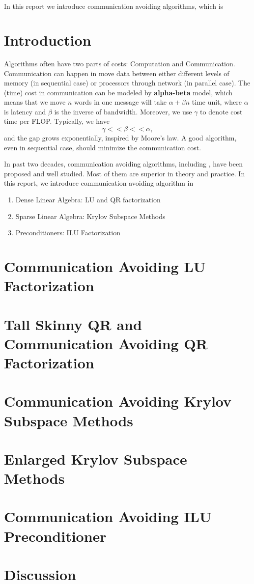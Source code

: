 \documentclass{article}
\begin{document}
	\maketitle
	\thispagestyle{fancy}
	\tableofcontents
	
	\section*{}
 In this report we introduce communication avoiding algorithms, which is
 
 
 \section{Introduction}
 Algorithms often have two parts of costs: Computation and Communication. Communication can happen in move data between either different levels of memory (in sequential case) or processors through network (in parallel case). The (time) cost in communication can be modeled by \textbf{alpha-beta} model, which means that we move $n$ words in one message will take $\alpha + \beta n$ time unit, where $\alpha$ is latency and $\beta$ is the inverse of bandwidth. Moreover, we use $\gamma$ to denote cost time per FLOP. Typically, we have $$\gamma << \beta << \alpha,$$ and the gap grows exponentially, inspired by Moore's law. A good algorithm, even in sequential case, should minimize the communication cost.
 
 
In past two decades, communication avoiding algorithms, including , have been proposed and well studied. Most of them are superior in theory and practice. In this report, we introduce communication avoiding algorithm in 
\begin{enumerate}
	\item Dense Linear Algebra: LU and QR factorization
	\item Sparse Linear Algebra: Krylov Subspace Methods
	\item Preconditioners: ILU Factorization
\end{enumerate}



 \section{Communication Avoiding LU Factorization}
 
 \section{Tall Skinny QR and Communication Avoiding QR Factorization}
 
 \section{Communication Avoiding Krylov Subspace Methods}
 
 \section{Enlarged Krylov Subspace Methods}
 
 \section{Communication Avoiding ILU Preconditioner}
 
 \section{Discussion}
\end{document}
